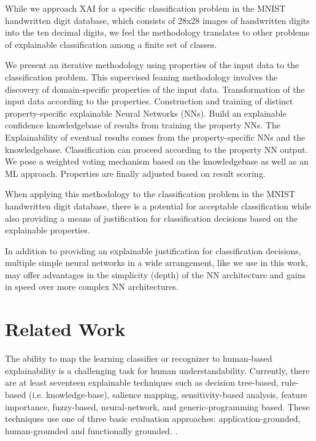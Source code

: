\documentclass[conference]{IEEEtran}
\begin{document}
While we approach XAI for a specific classification problem in the MNIST handwritten digit database, which consists of 28x28 images of handwritten digits into the ten decimal digits, we feel the methodology translates to other problems of explainable classification among a finite set of classes.

We present an iterative methodology using properties of the input data to the classification problem.  This supervised leaning methodology involves the discovery of domain-specific properties of the input data.  Transformation of the input data according to the properties.  Construction and training of distinct property-specific explainable Neural Networks (NNs).  Build an explainable confidence knowledgebase of results from training the property NNs.  The Explainability of eventual results comes from the property-specific NNs and the knowledgebase.  Classification can proceed according to the property NN output.  We pose a weighted voting mechanism based on the knowledgebase as well as an ML approach.   Properties are finally adjusted based on result scoring.

When applying this methodology to the classification problem in the MNIST handwritten digit database, there is a potential for acceptable classification while also providing a means of justification for classification decisions based on the explainable properties.

In addition to providing an explainable justification for classification decisions, multiple simple neural networks in a wide arrangement, like we use in this work, may offer advantages in the simplicity (depth) of the NN architecture and gains in speed over more complex NN architectures.

\section{Related Work}

The ability to map the learning classifier or recognizer to human-based explainability is a challenging task for human understandability.  Currently, there are at least seventeen explainable techniques such as
decision tree-based, rule-based (i.e. knowledge-base), salience mapping,
sensitivity-based analysis, feature importance, fuzzy-based, neural-network, and generic-programming based.  These techniques use one of three basic evaluation approaches: application-grounded, human-grounded and functionally grounded. \cite{Hagras18} \cite{BlackBox18} \cite{Survey18} \cite{Fuzzy19} \cite{GP18}.
\end{document}
